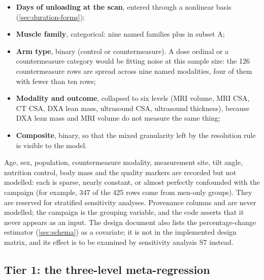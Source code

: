 \begin{itemize}
  \item \textbf{Days of unloading at the scan}, entered through a nonlinear basis (\cref{sec:duration-forms});
  \item \textbf{Muscle family}, categorical: nine named families plus  in subset A;
  \item \textbf{Arm type}, binary (control or countermeasure). A dose ordinal or a countermeasure category would be
        fitting noise at this sample size: the 126 countermeasure rows are spread across nine named modalities,
        four of them with fewer than ten rows;
  \item \textbf{Modality and outcome}, collapsed to six levels (MRI volume, MRI CSA, CT CSA, DXA lean mass,
        ultrasound CSA, ultrasound thickness), because DXA lean mass and MRI volume do not measure the same thing;
  \item \textbf{Composite}, binary, so that the mixed granularity left by the resolution rule is visible to the model.
\end{itemize}

Age, sex, population, countermeasure modality, measurement site, tilt angle, nutrition control, body mass and the
quality markers are recorded but not modelled: each is sparse, nearly constant, or almost perfectly confounded with
the campaign (for example, 347 of the 425 rows come from men-only groups). They are reserved for stratified
sensitivity analyses. Provenance columns and  are never modelled; the campaign is the grouping
variable, and the code asserts that it never appears as an input. The design document also lists the
percentage-change estimator (\cref{sec:schema}) as a covariate; it is not in the implemented design matrix, and its
effect is to be examined by sensitivity analysis S7 instead. 

\subsection{Tier 1: the three-level meta-regression}
\label{sec:tier1}


